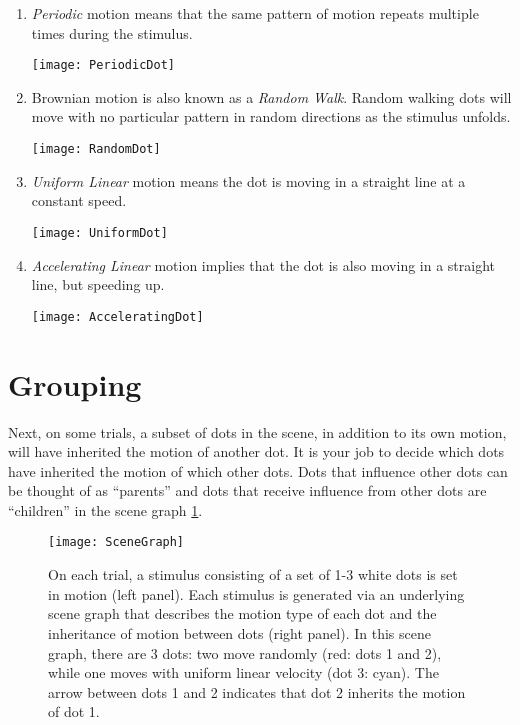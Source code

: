 \documentclass{scrartcl}
\begin{document}
\begin{enumerate}
  \item \emph{Periodic} motion means that the same pattern of motion repeats multiple times during the stimulus.

  \texttt{[image: PeriodicDot]}
  \item Brownian motion is also known as a \emph{Random Walk}. Random walking dots will move with no particular pattern in random directions as the stimulus unfolds.

  \texttt{[image: RandomDot]}
  \item \emph{Uniform Linear} motion means the dot is moving in a straight line at a constant speed.

  \texttt{[image: UniformDot]}
  \item \emph{Accelerating Linear} motion implies that the dot is also moving in a straight line, but speeding up.

  \texttt{[image: AcceleratingDot]}
\end{enumerate}


\section{Grouping}
  Next, on some trials, a subset of dots in the scene, in addition to its own motion, will have inherited the motion of another dot. It is your job to decide which dots have inherited the motion of which other dots. Dots that influence other dots can be thought of as ``parents'' and dots that receive influence from other dots are ``children'' in the scene graph \ref{fig:scenegraph}.

\begin{figure}[h]
    \centering
    \texttt{[image: SceneGraph]}
    \caption{On each trial, a stimulus consisting of a set of 1-3 white dots is set in motion (left panel). Each stimulus is generated via an underlying scene graph that describes the motion type of each dot and the inheritance of motion between dots (right panel). In this scene graph, there are 3 dots: two move randomly (red: dots 1 and 2), while one moves with uniform linear velocity (dot 3: cyan). The arrow between dots 1 and 2 indicates that dot 2 inherits the motion of dot 1.}
    \label{fig:scenegraph}
\end{figure}
  

\vspace{10mm}
\end{document}

